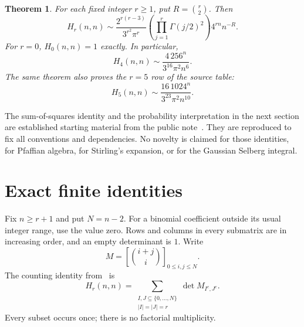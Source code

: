 \documentclass[11pt]{article}
\newtheorem{theorem}{Theorem}
\theoremstyle{remark}
\begin{document}
\begin{theorem}\label{thm:main}
For each fixed integer $r\ge1$, put $R=\binom r2$. Then
\begin{equation}\label{eq:main}
 H_r(n,n)\sim
 \frac{2^{r(r-3)}}{3^{r^2}\pi^r}
 \left(\prod_{j=1}^r\Gamma(j/2)^2\right)4^{rn}n^{-R}.
\end{equation}
For $r=0$, $H_0(n,n)=1$ exactly. In particular,
\begin{equation}\label{eq:target}
 \boxed{H_4(n,n)\sim\frac{4\,256^n}{3^{16}\pi^2n^6}.}
\end{equation}
The same theorem also proves the $r=5$ row of the source table:
\[
 H_5(n,n)\sim\frac{16\,1024^n}{3^{23}\pi^2n^{10}}.
\]
\end{theorem}

The sum-of-squares identity and the probability interpretation in the next
section are established starting material from the public note~\cite{prior}.
They are reproduced to fix all conventions and dependencies. No novelty is
claimed for those identities, for Pfaffian algebra, for Stirling's expansion,
or for the Gaussian Selberg integral.

\section{Exact finite identities}

Fix $n\ge r+1$ and put $N=n-2$. For a binomial coefficient outside its usual
integer range, use the value zero. Rows and columns in every submatrix are in
increasing order, and an empty determinant is $1$. Write
\[
 M=\left[\binom{i+j}{i}\right]_{0\le i,j\le N}.
\]
The counting identity from~\cite{dk} is
\begin{equation}\label{eq:source}
 H_r(n,n)=\sum_{\substack{I,J\subseteq\{0,\ldots,N\}\\|I|=|J|=r}}
              \det M_{I^c,J^c}.
\end{equation}
Every subset occurs once; there is no factorial multiplicity.
\end{document}
